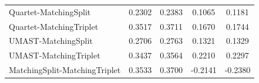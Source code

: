 \begin{table}[htbp]
\begin{tabular}{lcccc}
Quartet-MatchingSplit & \cellcolor[rgb]{0.23,0.77,0.00}0.2302 & \cellcolor[rgb]{0.24,0.76,0.00}0.2383 & \cellcolor[rgb]{0.11,0.89,0.00}0.1065 & \cellcolor[rgb]{0.12,0.88,0.00}0.1181 \\
Quartet-MatchingTriplet & \cellcolor[rgb]{0.35,0.65,0.00}0.3517 & \cellcolor[rgb]{0.37,0.63,0.00}0.3711 & \cellcolor[rgb]{0.17,0.83,0.00}0.1670 & \cellcolor[rgb]{0.17,0.83,0.00}0.1744 \\
UMAST-MatchingSplit & \cellcolor[rgb]{0.27,0.73,0.00}0.2706 & \cellcolor[rgb]{0.28,0.72,0.00}0.2763 & \cellcolor[rgb]{0.13,0.87,0.00}0.1321 & \cellcolor[rgb]{0.13,0.87,0.00}0.1329 \\
UMAST-MatchingTriplet & \cellcolor[rgb]{0.34,0.66,0.00}0.3437 & \cellcolor[rgb]{0.36,0.64,0.00}0.3564 & \cellcolor[rgb]{0.22,0.78,0.00}0.2210 & \cellcolor[rgb]{0.23,0.77,0.00}0.2297 \\
MatchingSplit-MatchingTriplet & \cellcolor[rgb]{0.35,0.65,0.00}0.3533 & \cellcolor[rgb]{0.37,0.63,0.00}0.3700 & \cellcolor[rgb]{-0.21,1.21,0.00}-0.2141 & \cellcolor[rgb]{-0.24,1.24,0.00}-0.2380 \\
\bottomrule
\end{tabular}
\end{table}
